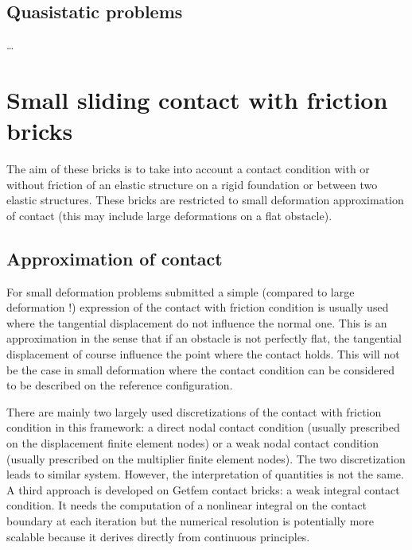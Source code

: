 \documentclass[a4paper,11pt,english]{sphinxmanual}
\begin{document}
\subsection{Quasi\sphinxhyphen{}static problems}
\label{\detokenize{userdoc/model_time_integration:quasi-static-problems}}
…

\ignorespaces 

\section{Small sliding contact with friction bricks}
\label{\detokenize{userdoc/model_contact_friction:small-sliding-contact-with-friction-bricks}}\label{\detokenize{userdoc/model_contact_friction:ud-model-contact-friction}}\label{\detokenize{userdoc/model_contact_friction:index-0}}\label{\detokenize{userdoc/model_contact_friction::doc}}
The aim of these bricks is to take into account a contact condition with or without friction of an elastic structure on a rigid foundation or between two elastic structures. These bricks are restricted to small deformation approximation of contact (this may include large deformations on a flat obstacle).


\subsection{Approximation of contact}
\label{\detokenize{userdoc/model_contact_friction:approximation-of-contact}}
For small deformation problems submitted
a simple (compared to large deformation !) expression of the contact with friction condition is usually used where the tangential displacement do not influence the normal one. This is an approximation in the sense that if an obstacle is not perfectly flat, the tangential displacement of course influence the point where the contact holds. This will not be the case in small deformation where the contact condition can be considered to be described on the reference configuration.

There are mainly two largely used discretizations of the contact with friction condition in this framework: a direct nodal contact condition (usually prescribed on the displacement finite element nodes) or a weak nodal contact condition (usually prescribed on the multiplier finite element nodes). The two discretization leads to similar system. However, the interpretation of quantities is not the same. A third approach is developed on Getfem contact bricks: a weak integral contact condition. It needs the computation of a non\sphinxhyphen{}linear integral on the contact boundary at each iteration but the numerical resolution is potentially more scalable because it derives directly from continuous principles.
\end{document}
